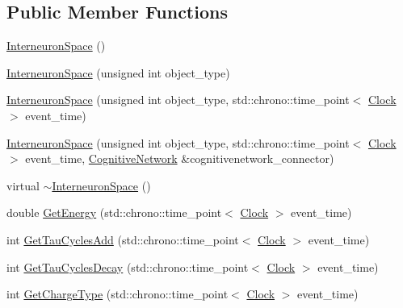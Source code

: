 \subsection*{Public Member Functions}
\begin{DoxyCompactItemize}
\item 
\mbox{\hyperlink{class_interneuron_space_a4ad439037f087e7d5cb3e1d8c581ee5f}{Interneuron\+Space}} ()
\item 
\mbox{\hyperlink{class_interneuron_space_a18d5d4920073a9a93ee3cb8f5efe9211}{Interneuron\+Space}} (unsigned int object\+\_\+type)
\item 
\mbox{\hyperlink{class_interneuron_space_a753903f3c74415922607846040ac50a6}{Interneuron\+Space}} (unsigned int object\+\_\+type, std\+::chrono\+::time\+\_\+point$<$ \mbox{\hyperlink{universe_8h_a0ef8d951d1ca5ab3cfaf7ab4c7a6fd80}{Clock}} $>$ event\+\_\+time)
\item 
\mbox{\hyperlink{class_interneuron_space_aa87eb8c7186542989fccdadc594c5915}{Interneuron\+Space}} (unsigned int object\+\_\+type, std\+::chrono\+::time\+\_\+point$<$ \mbox{\hyperlink{universe_8h_a0ef8d951d1ca5ab3cfaf7ab4c7a6fd80}{Clock}} $>$ event\+\_\+time, \mbox{\hyperlink{class_cognitive_network}{Cognitive\+Network}} \&cognitivenetwork\+\_\+connector)
\item 
virtual \mbox{\hyperlink{class_interneuron_space_aff0056e3c60b7eff3ad4ca12f6756628}{$\sim$\+Interneuron\+Space}} ()
\item 
double \mbox{\hyperlink{class_interneuron_space_a677430712211956219767d4fa71d20e6}{Get\+Energy}} (std\+::chrono\+::time\+\_\+point$<$ \mbox{\hyperlink{universe_8h_a0ef8d951d1ca5ab3cfaf7ab4c7a6fd80}{Clock}} $>$ event\+\_\+time)
\item 
int \mbox{\hyperlink{class_interneuron_space_abd37d409a97acca62d11576314bdfcf4}{Get\+Tau\+Cycles\+Add}} (std\+::chrono\+::time\+\_\+point$<$ \mbox{\hyperlink{universe_8h_a0ef8d951d1ca5ab3cfaf7ab4c7a6fd80}{Clock}} $>$ event\+\_\+time)
\item 
int \mbox{\hyperlink{class_interneuron_space_a1024eadca0b56be9b54593ea47c5879f}{Get\+Tau\+Cycles\+Decay}} (std\+::chrono\+::time\+\_\+point$<$ \mbox{\hyperlink{universe_8h_a0ef8d951d1ca5ab3cfaf7ab4c7a6fd80}{Clock}} $>$ event\+\_\+time)
\item 
int \mbox{\hyperlink{class_interneuron_space_a90a2c950dd426ed3f015e3c186e877fd}{Get\+Charge\+Type}} (std\+::chrono\+::time\+\_\+point$<$ \mbox{\hyperlink{universe_8h_a0ef8d951d1ca5ab3cfaf7ab4c7a6fd80}{Clock}} $>$ event\+\_\+time)
\item 

\end{DoxyCompactItemize}
